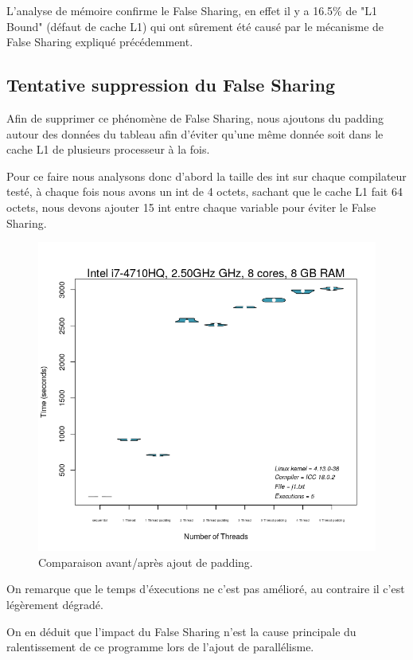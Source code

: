 \documentclass[
 aip,
 jmp,
 amsmath,amssymb,
 reprint
]{revtex4-1}
\begin{document}
L'analyse de mémoire confirme le False Sharing\pageref{Fig:false_sharing}, en effet il y a 16.5\% de "L1 Bound" (défaut de cache L1) qui ont sûrement été causé par le mécanisme de False Sharing expliqué précédemment.

\subsection{Tentative suppression du False Sharing}

Afin de supprimer ce phénomène de False Sharing, nous ajoutons du padding autour des données du tableau afin d'éviter qu'une même donnée soit dans le cache L1 de plusieurs processeur à la fois.\par
Pour ce faire nous analysons donc d'abord la taille des int sur chaque compilateur testé, à chaque fois nous avons un int de 4 octets, sachant que le cache L1 fait 64 octets, nous devons ajouter 15 int entre chaque variable pour éviter le False Sharing.\par

\begin{figure}[H]
  \includegraphics[width=\linewidth, keepaspectratio=true]{parallel_padding.png}
  \centering
  \caption{Comparaison avant/après ajout de padding.\label{Fig:padding}}
\end{figure}

On remarque que le temps d'éxecutions ne c'est pas amélioré, au contraire il c'est légèrement dégradé.\par
On en déduit que l'impact du False Sharing n'est la cause principale du ralentissement de ce programme lors de l'ajout de parallélisme.
\end{document}
